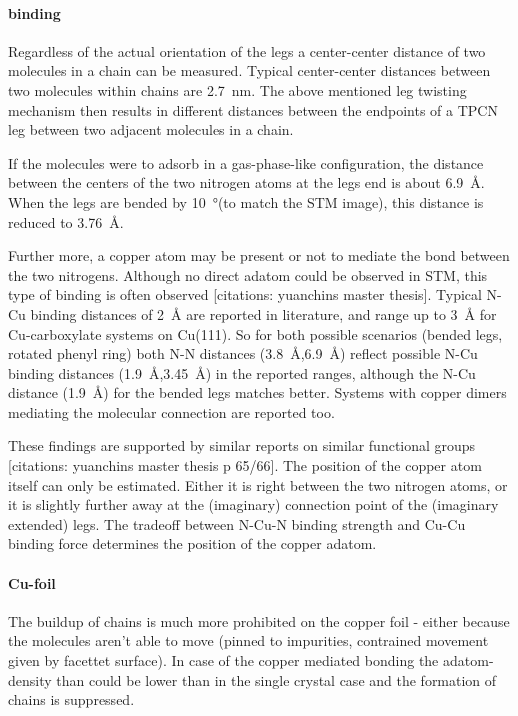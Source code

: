 \paragraph{binding}
\label{chapter:TPCN-adatoms}
Regardless of the actual orientation of the legs a center-center distance of two molecules in a chain can be measured. Typical center-center distances between two molecules within chains are \SI{2.7}{\nano \meter}.
The above mentioned leg twisting mechanism then results in different distances between the endpoints of a TPCN leg between two adjacent molecules in a chain. 

If the molecules were to adsorb in a gas-phase-like configuration, the distance between the centers of the two nitrogen atoms at the legs end is about \SI{6.9}{\angstrom}. When the legs are bended by \SI{10}{\degree}(to match the STM image), this distance is reduced to \SI{3.76}{\angstrom}.

Further more, a copper atom may be present or not to mediate the bond between the two nitrogens. Although no direct adatom could be observed in STM, this type of binding is often observed [citations: yuanchins master thesis]\cite{klappenberger_temperature_2008}. Typical N-Cu binding distances of \SI{2}{\angstrom} are reported in literature\cite{klappenberger_temperature_2008}, and range up to \SI{3}{\angstrom} for Cu-carboxylate systems on Cu(111)\cite{classen_templated_2005}. So for both possible scenarios (bended legs, rotated phenyl ring) both N-N distances (\SI{3.8}{\angstrom},\SI{6.9}{\angstrom}) reflect possible N-Cu binding distances (\SI{1.9}{\angstrom},\SI{3.45}{\angstrom}) in the reported ranges, although the N-Cu distance (\SI{1.9}{\angstrom}) for the bended legs matches better. 
Systems with copper dimers mediating the molecular connection are reported too\cite{lin_real-time_2002}.

These findings are supported by similar reports on similar functional groups [citations: yuanchins master thesis p 65/66]. The position of the copper atom itself can only be estimated. Either it is right between the two nitrogen atoms, or it is slightly further away at the (imaginary) connection point of the (imaginary extended) legs. The tradeoff between N-Cu-N binding strength and Cu-Cu binding force determines the position of the copper adatom.

\paragraph{Cu-foil}
The buildup of chains is much more prohibited on the copper foil - either because the molecules aren't able to move (pinned to impurities, contrained movement given by facettet surface). In case of the copper mediated bonding the adatom-density than could be lower than in the single crystal case and the formation of chains is suppressed.